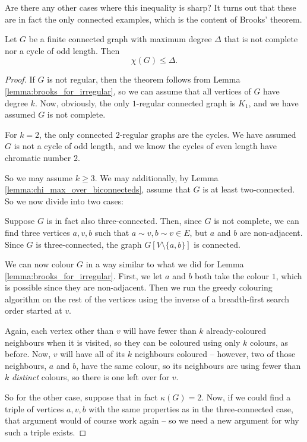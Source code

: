 \documentclass[nobib]{tufte-handout}
\begin{document}
Are there any other cases where this inequality is sharp? It turns out that these are in fact the only connected examples, which is the content of Brooks' theorem.

\begin{theorem}[Brooks, 1941]
  Let $G$ be a finite connected graph with maximum degree $\Delta$ that is not complete nor a cycle of odd length. Then
  $$\chi(G) \leq \Delta.$$

  \begin{proof}
    If $G$ is not regular, then the theorem follows from Lemma \ref{lemma:brooks_for_irregular}, so we can assume that all vertices of $G$ have degree $k$. Now, obviously, the only $1$-regular connected graph is $K_1$, and we have assumed $G$ is not complete.

    For $k=2$, the only connected $2$-regular graphs are the cycles. We have assumed $G$ is not a cycle of odd length, and we know the cycles of even length have chromatic number $2$.

    So we may assume $k \geq 3$. We may additionally, by Lemma \ref{lemma:chi_max_over_biconnecteds}, assume that $G$ is at least two-connected. So we now divide into two cases:

    Suppose $G$ is in fact also three-connected. Then, since $G$ is not complete, we can find three vertices $a, v, b$ such that $a \sim v, b \sim v \in E$, but $a$ and $b$ are non-adjacent. Since $G$ is three-connected, the graph $G[V\setminus \{a,b\}]$ is connected.

    We can now colour $G$ in a way similar to what we did for Lemma \ref{lemma:brooks_for_irregular}. First, we let $a$ and $b$ both take the colour $1$, which is possible since they are non-adjacent. Then we run the greedy colouring algorithm on the rest of the vertices using the inverse of a breadth-first search order started at $v$.

    Again, each vertex other than $v$ will have fewer than $k$ already-coloured neighbours when it is visited, so they can be coloured using only $k$ colours, as before. Now, $v$ will have all of its $k$ neighbours coloured -- however, two of those neighbours, $a$ and $b$, have the same colour, so its neighbours are using fewer than $k$ \emph{distinct} colours, so there is one left over for $v$.

    So for the other case, suppose that in fact $\kappa(G) = 2$. Now, if we could find a triple of vertices $a, v, b$ with the same properties as in the three-connected case, that argument would of course work again -- so we need a new argument for why such a triple exists.


\end{proof}
\end{theorem}
\end{document}
